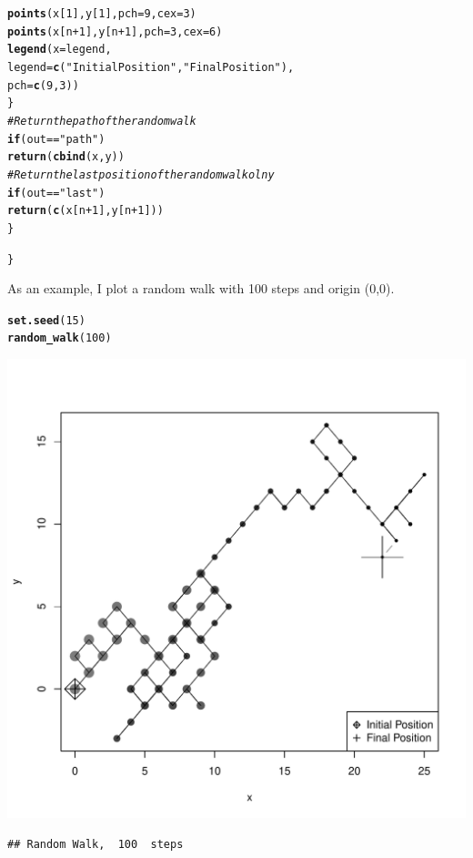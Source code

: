 \documentclass{llncs}\usepackage[]{graphicx}\usepackage[]{color}
\makeatletter
\def\maxwidth{ %
  \ifdim\Gin@nat@width>\linewidth
    \linewidth
  \else
    \Gin@nat@width
  \fi
}
\newcommand{\hlnum}[1]{\textcolor[rgb]{0.686,0.059,0.569}{#1}}%
\newcommand{\hlstr}[1]{\textcolor[rgb]{0.192,0.494,0.8}{#1}}%
\newcommand{\hlcom}[1]{\textcolor[rgb]{0.678,0.584,0.686}{\textit{#1}}}%
\newcommand{\hlopt}[1]{\textcolor[rgb]{0,0,0}{#1}}%
\newcommand{\hlstd}[1]{\textcolor[rgb]{0.345,0.345,0.345}{#1}}%
\newcommand{\hlkwa}[1]{\textcolor[rgb]{0.161,0.373,0.58}{\textbf{#1}}}%
\newcommand{\hlkwc}[1]{\textcolor[rgb]{0.333,0.667,0.333}{#1}}%
\newcommand{\hlkwd}[1]{\textcolor[rgb]{0.737,0.353,0.396}{\textbf{#1}}}%
\newenvironment{kframe}{%
 \def\at@end@of@kframe{}%
 \ifinner\ifhmode%
  \def\at@end@of@kframe{\end{minipage}}%
  \begin{minipage}{\columnwidth}%
 \fi\fi%
 \def\FrameCommand##1{\hskip\@totalleftmargin \hskip-\fboxsep
 \colorbox{shadecolor}{##1}\hskip-\fboxsep
     \hskip-\linewidth \hskip-\@totalleftmargin \hskip\columnwidth}%
 \MakeFramed {\advance\hsize-\width
   \@totalleftmargin\z@ \linewidth\hsize
   \@setminipage}}%
 {\par\unskip\endMakeFramed%
 \at@end@of@kframe}
\newenvironment{knitrout}{}{} %
\makeatother
\begin{document}
\begin{knitrout}
\begin{kframe}
\begin{alltt}
      \hlkwd{points}\hlstd{(x[}\hlnum{1}\hlstd{],y[}\hlnum{1}\hlstd{],}\hlkwc{pch}\hlstd{=}\hlnum{9}\hlstd{,}\hlkwc{cex}\hlstd{=}\hlnum{3}\hlstd{)}
      \hlkwd{points}\hlstd{(x[n}\hlopt{+}\hlnum{1}\hlstd{],y[n}\hlopt{+}\hlnum{1}\hlstd{],}\hlkwc{pch}\hlstd{=}\hlnum{3}\hlstd{,}\hlkwc{cex}\hlstd{=}\hlnum{6}\hlstd{)}
      \hlkwd{legend}\hlstd{(} \hlkwc{x}\hlstd{=legend,}
            \hlkwc{legend}\hlstd{=}\hlkwd{c}\hlstd{(}\hlstr{"Initial Position"}\hlstd{,}\hlstr{"Final Position"}\hlstd{),}
            \hlkwc{pch}\hlstd{=}\hlkwd{c}\hlstd{(}\hlnum{9}\hlstd{,}\hlnum{3}\hlstd{) )}
    \hlstd{\}}
    \hlcom{#Return the path of the random walk}
    \hlkwa{if} \hlstd{(out}\hlopt{==}\hlstr{"path"}\hlstd{)}
      \hlkwd{return}\hlstd{(}\hlkwd{cbind}\hlstd{(x,y))}
    \hlcom{#Return the last position of the random walk olny}
    \hlkwa{if} \hlstd{(out} \hlopt{==} \hlstr{"last"}\hlstd{)}
      \hlkwd{return}\hlstd{(}\hlkwd{c}\hlstd{(x[n}\hlopt{+}\hlnum{1}\hlstd{],y[n}\hlopt{+}\hlnum{1}\hlstd{]))}
  \hlstd{\}}

\hlstd{\}}
\end{alltt}
\end{kframe}
\end{knitrout}
As an example, I plot a random walk with 100 steps and origin (0,0).
\begin{knitrout}
\color{fgcolor}\begin{kframe}
\begin{alltt}
\hlkwd{set.seed}\hlstd{(}\hlnum{15}\hlstd{)}
\hlkwd{random_walk}\hlstd{(}\hlnum{100}\hlstd{)}
\end{alltt}
\end{kframe}
\includegraphics[width=\maxwidth]{figure/unnamed-chunk-19-1} 
\begin{kframe}\begin{lstlisting}[basicstyle=\ttfamily,breaklines=true]
## Random Walk,  100  steps
\end{lstlisting}
\end{kframe}
\end{knitrout}
\end{document}

